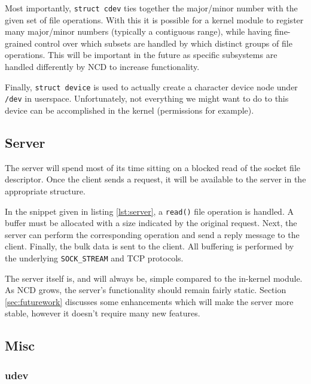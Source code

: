 \documentclass[11pt,twocolumn]{article}
\begin{document}
Most importantly, \texttt{struct cdev} ties together the major/minor
number with the given set of file operations. With this it is possible
for a kernel module to register many major/minor numbers (typically
a contiguous range), while having fine-grained control over which
subsets are handled by which distinct groups of file operations. This
will be important in the future as specific subsystems are handled
differently by NCD to increase functionality.

Finally, \texttt{struct device} is used to actually create a character
device node under \texttt{/dev} in userspace. Unfortunately, not
everything we might want to do to this device can be accomplished in the
kernel (permissions for example).

\subsection{Server}



The server will spend most of its time sitting on a blocked read of the
socket file descriptor. Once the client sends a request, it will be
available to the server in the appropriate structure.

In the snippet given in listing \ref{lst:server}, a \texttt{read()} file
operation is handled. A buffer must be allocated with a size
indicated by the original request. Next, the server can perform the
corresponding operation and send a reply message to the client. Finally,
the bulk data is sent to the client. All buffering is performed by the
underlying \texttt{SOCK\_STREAM} and TCP protocols.

The server itself is, and will always be, simple compared to the
in-kernel module. As NCD grows, the server's functionality should remain
fairly static. Section \ref{sec:futurework} discusses some enhancements
which will make the server more stable, however it doesn't require many
new features.

\subsection{Misc}

\subsubsection{udev}
\label{subsec:udev}
\end{document}

